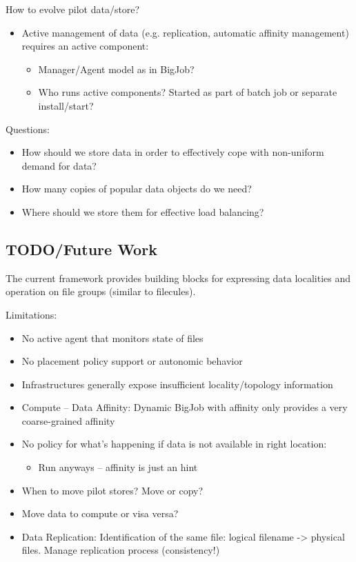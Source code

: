 \documentclass[conference,final]{IEEEtran}
\begin{document}
How to evolve pilot data/store?
\begin{itemize}
	\item Active management of data (e.g. replication, automatic affinity management) requires an active component:
	\begin{itemize}
		\item Manager/Agent model as in BigJob?
		\item Who runs active components? Started as part of batch job or separate install/start?
	\end{itemize}
\end{itemize}

Questions:
\begin{itemize}
    \item How should
    we store data in order to effectively cope with non-uniform demand for
    data? 
    \item How many copies of popular data objects do we need? 
    \item Where should we store them for effective load balancing?
\end{itemize}

\subsection{TODO/Future Work}
The current framework provides building blocks for expressing data localities and operation on file groups (similar to filecules).

Limitations:
\begin{itemize}
    \item No active agent that monitors state of files
    \item No placement policy support or autonomic behavior
    \item Infrastructures generally expose insufficient locality/topology information
    \item Compute – Data Affinity: Dynamic BigJob with affinity only provides a very coarse-grained affinity
    \item No policy for what’s happening if data is not available in right location:
    \begin{itemize}
        \item Run anyways – affinity is just an hint
    \end{itemize}
    \item When to move pilot stores? Move or copy?
    \item Move data to compute or visa versa?
    \item Data Replication: Identification of the same file: logical filename -> physical files. Manage replication process (consistency!)
\end{itemize}
\end{document}
